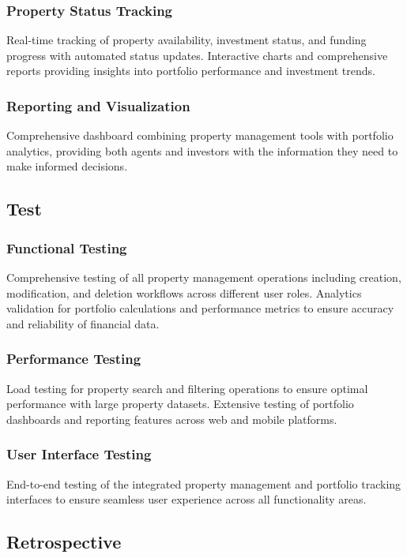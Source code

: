\subsubsection{Property Status Tracking}
Real-time tracking of property availability, investment status, and funding progress with automated status updates. Interactive charts and comprehensive reports providing insights into portfolio performance and investment trends.

\subsubsection{Reporting and Visualization}
Comprehensive dashboard combining property management tools with portfolio analytics, providing both agents and investors with the information they need to make informed decisions.

\subsection{Test}
\subsubsection{Functional Testing}
Comprehensive testing of all property management operations including creation, modification, and deletion workflows across different user roles. Analytics validation for portfolio calculations and performance metrics to ensure accuracy and reliability of financial data.

\subsubsection{Performance Testing}
Load testing for property search and filtering operations to ensure optimal performance with large property datasets. Extensive testing of portfolio dashboards and reporting features across web and mobile platforms.

\subsubsection{User Interface Testing}
End-to-end testing of the integrated property management and portfolio tracking interfaces to ensure seamless user experience across all functionality areas.

\subsection{Retrospective}

